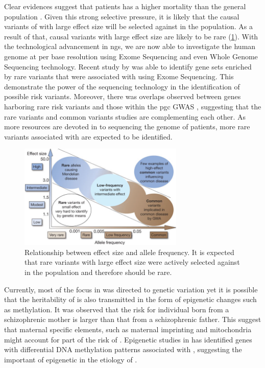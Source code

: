 \documentclass[12pt]{scrbook}
\newcommand*{\glng}{\glsentrylong}
\begin{document}
	Clear evidences suggest that \glng{scz} patients has a higher mortality than the general population \citep{Saha2007}.
	Given this strong selective pressure, it is likely that the causal variants of \glng{scz} with large effect size will be selected against in the population. 
	As a result of that, causal variants with large effect size are likely to be rare (\cref{fig:effectSize}).
	With the technological advancement in \gls{ngs}, we are now able to investigate the human genome at per base resolution using Exome Sequencing and even Whole Genome Sequencing technology.
	Recent study by \citet{Purcell2014} was able to identify gene sets enriched by rare variants that were associated with \glng{scz} using Exome Sequencing. 
	This demonstrate the power of the sequencing technology in the identification of possible risk variants. 
	Moreover, there was overlaps observed between genes harboring rare risk variants and those within the \gls{pgc} \glng{scz} \gls{GWAS} \citep{Purcell2014}, suggesting that the rare variants and common variants studies are complementing each other.
	As more resources are devoted in to sequencing the genome of \glng{scz} patients, more rare variants associated with \glng{scz} are expected to be identified.
	\begin{figure}
		\centering
		\includegraphics[width=0.7\textwidth]{figure/maf_effectSize.png}
		\caption[Relationship between Effect Size and Allele Frequency]{
			Relationship between effect size and allele frequency. 
			It is expected that rare variants with large effect size were actively selected against in the population and therefore should be rare.
		}
		\label{fig:effectSize}
	\end{figure}
	
	Currently, most of the focus in \glng{scz} was directed to genetic variation yet it is possible that the heritability of \glng{scz} is also transmitted in the form of epigenetic changes such as methylation.
	It was observed that the risk for individual born from a schizophrenic mother is larger than that from a schizophrenic father. 
	This suggest that maternal specific elements, such as maternal imprinting and mitochondria might account for part of the risk of \glng{scz}. 
	Epigenetic studies in \glng{scz} \citep{Wockner2014,Nishioka2012} has identified genes with differential DNA methylation patterns associated with \glng{scz}, suggesting the important of epigenetic in the etiology of \glng{scz}.
	
\end{document}
